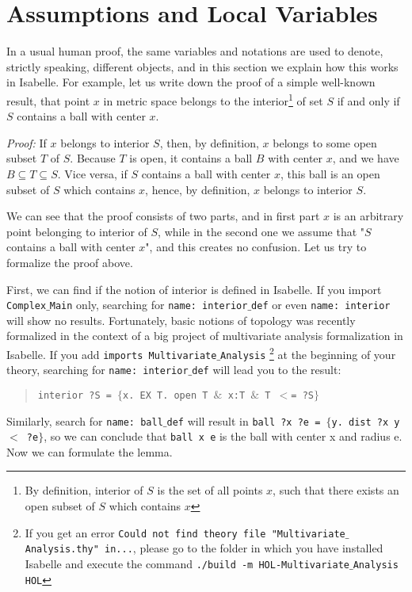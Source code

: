 \documentclass[11pt]{article}
\newcommand{\prog}[1]{\par\noindent\begin{quote}#1\end{quote}\par\noindent}
\begin{document}
\section{Assumptions and Local Variables}

In a usual human proof, the same variables and notations are used to denote, strictly speaking, different objects, and in this section we explain how this works in Isabelle. For example, let us write down the proof of a simple well-known result, that point $x$ in metric space belongs to the interior\footnote{By definition, interior of $S$ is the set of all points $x$, such that there exists an open subset of $S$ which contains $x$} of set $S$ if and only if $S$ contains a ball with center $x$.

\emph{Proof:} If $x$ belongs to interior $S$, then, by definition, $x$ belongs to some open subset $T$ of $S$. Because $T$ is open, it contains a ball $B$ with center $x$, and we have $B\subseteq T\subseteq S$. Vice versa, if $S$ contains a ball with center $x$, this ball is an open subset of $S$ which contains $x$, hence, by definition, $x$ belongs to interior $S$.

We can see that the proof consists of two parts, and in first part $x$ is an arbitrary point belonging to interior of $S$, while in the second one we assume that "$S$ contains a ball with center $x$", and this creates no confusion. Let us try to formalize the proof above.

First, we can find if the notion of interior is defined in Isabelle. If you import {\tt Complex$\_$Main} only, searching for {\tt name:~interior$\_$def} or even {\tt name:~interior} will show no results. Fortunately, basic notions of topology was recently formalized in the context of a big project of multivariate analysis formalization in Isabelle. If you add {\tt imports~Multivariate$\_$Analysis}
\footnote{If you get an error {\tt Could not find theory file "Multivariate$\_$Analysis.thy" in...}, please go to the folder in which you have installed Isabelle and execute the command {\tt ./build -m HOL-Multivariate$\_$Analysis HOL}} at the beginning of your theory, searching for {\tt name:~interior$\_$def} will lead you to the result:

\prog{\tt interior ?S = $\{$x. EX T. open T $\&$ x:T $\&$ T $<$= ?S$\}$}%

Similarly, search for {\tt name:~ball$\_$def} will result in {\tt ball~?x~?e~=~$\{$y.~dist~?x~y~$<$~?e$\}$}, so we can conclude that {\tt ball x e} is the ball with center x and radius e. Now we can formulate the lemma.
\end{document}
